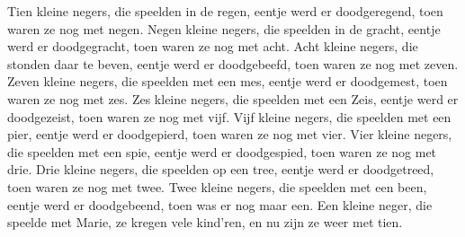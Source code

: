 \beginverse*
Tien kleine negers,
die speelden in de regen,
eentje werd er doodgeregend,
toen waren ze nog met negen.
\endverse
\beginverse*
Negen kleine negers,
die speelden in de gracht,
eentje werd er doodgegracht,
toen waren ze nog met acht.
\endverse
\beginverse*
Acht kleine negers,
die stonden daar te beven,
eentje werd er doodgebeefd,
toen waren ze nog met zeven.
\endverse
\beginverse*
Zeven kleine negers,
die speelden met een mes,
eentje werd er doodgemest,
toen waren ze nog met zes.
\endverse
\beginverse*
Zes kleine negers,
die speelden met een Zeis,
eentje werd er doodgezeist,
toen waren ze nog met vijf.
\endverse
\beginverse*
Vijf kleine negers,
die speelden met een pier,
eentje werd er doodgepierd,
toen waren ze nog met vier.
\endverse
\beginverse*
Vier kleine negers,
die speelden met een spie,
eentje werd er doodgespied,
toen waren ze nog met drie.
\endverse
\beginverse*
Drie kleine negers,
die speelden op een tree,
eentje werd er doodgetreed,
toen waren ze nog met twee.
\endverse
\beginverse*
Twee kleine negers,
die speelden met een been,
eentje werd er doodgebeend,
toen was er nog maar een.
\endverse
\beginverse*
Een kleine neger,
die speelde met Marie,
ze kregen vele kind'ren,
en nu zijn ze weer met tien.
\endverse
\endsong